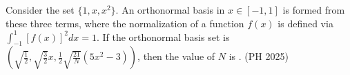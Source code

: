 \item Consider the set $\{1, x, x^2\}$. An orthonormal basis in $x \in [-1, 1]$ is formed from these three terms, where the normalization of a function $f(x)$ is defined via $\int_{-1}^1 [f(x)]^2dx = 1$. If the orthonormal basis set is $\left(\sqrt{\frac{1}{2}}, \sqrt{\frac{3}{2}}x, \frac{1}{2}\sqrt{\frac{21}{N}}(5x^2-3)\right)$, then the value of $N$ is \underline{\hspace{1cm}}.
\hfill (PH 2025)
